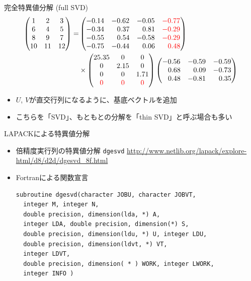 \documentclass[dvipdfmx]{beamer}
\begin{document}
\begin{frame}[t,fragile]{完全特異値分解 (full SVD)}
  \[
  \begin{split}
    \begin{pmatrix}
      1 & 2 & 3 \\
      6 & 4 & 5 \\
      8 & 9 & 7 \\
      10 & 11 & 12
    \end{pmatrix} =&
    \begin{pmatrix}
      -0.14 & -0.62 & -0.05 & {\color{red} -0.77} \\
      -0.34 & \ \ \,0.37 & \ \ \,0.81 & {\color{red} -0.29} \\
      -0.55 & \ \ \,0.54 & -0.58 & {\color{red} -0.29} \\
      -0.75 & -0.44 & \ \ \,0.06 & {\color{red} \ \ \,0.48}
    \end{pmatrix} \\
    &\times
    \begin{pmatrix}
      25.35 & 0 & 0 \\
      0 & 2.15 & 0 \\
      0 & 0 & 1.71 \\
      {\color{red} 0} & {\color{red} 0} & {\color{red} 0}
    \end{pmatrix}
    \begin{pmatrix}
      -0.56 & -0.59 & -0.59 \\
      \ \ \,0.68 & \ \ \,0.09 & -0.73 \\
      \ \ \,0.48 & -0.81 & \ \ \,0.35
    \end{pmatrix}
  \end{split}
  \]
  \begin{itemize}
  \item $U$, $V$が直交行列になるように、基底ベクトルを追加
  \item こちらを「SVD」、もともとの分解を「thin SVD」と呼ぶ場合も多い
  \end{itemize}
\end{frame}

\begin{frame}[t,fragile]{LAPACKによる特異値分解}
  \begin{itemize}
    \setlength{\itemsep}{1em}
  \item 倍精度実行列の特異値分解 {\tt dgesvd}
    \url{http://www.netlib.org/lapack/explore-html/d8/d2d/dgesvd_8f.html}
  \item Fortranによる関数宣言
\begin{lstlisting}
subroutine dgesvd(character JOBU, character JOBVT,
  integer M, integer N,
  double precision, dimension(lda, *) A,
  integer LDA, double precision, dimension(*) S,
  double precision, dimension(ldu, *) U, integer LDU,
  double precision, dimension(ldvt, *) VT,
  integer LDVT,
  double precision, dimension( * ) WORK, integer LWORK,
  integer INFO )
\end{lstlisting}
  \end{itemize}
\end{frame}
\end{document}
